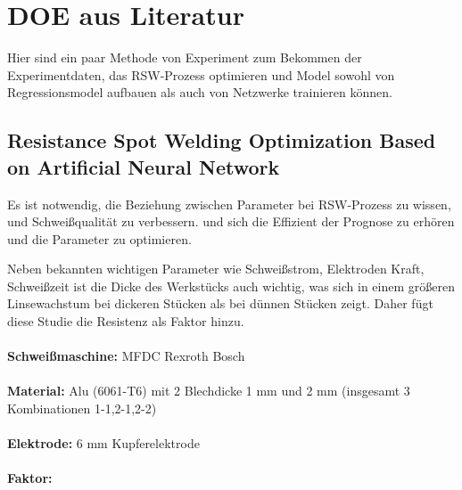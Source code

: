 \documentclass[english,ngerman]{tudscrreprt}
\begin{document}
\tableofcontents
\listoffigures
{}
\listoftables
{}
\printacronyms[style=acrotabu]
\printsymbols[style=symblongtabu]





\clearpage
\setcounter{page}{1}
\chapter{DOE aus Literatur}
Hier sind ein paar Methode von Experiment zum Bekommen der Experimentdaten, das RSW-Prozess optimieren und Model sowohl von Regressionsmodel aufbauen als auch von Netzwerke trainieren können. 

\section{Resistance Spot Welding Optimization Based on Artificial Neural Network\cite{Arunchai.2014}}
Es ist notwendig, die Beziehung zwischen Parameter bei RSW-Prozess zu wissen, und Schweißqualität zu verbessern. und sich die Effizient der Prognose zu erhören und die Parameter zu optimieren.

Neben bekannten wichtigen Parameter wie Schweißstrom, Elektroden Kraft, Schweißzeit ist die Dicke des Werkstücks auch wichtig, was sich in einem größeren Linsewachstum bei dickeren Stücken als bei dünnen Stücken zeigt. Daher fügt diese Studie die Resistenz als Faktor hinzu.\\
\\
\textbf{Schweißmaschine: }MFDC Rexroth Bosch\\
\\
\textbf{Material: }Alu (6061-T6) mit 2 Blechdicke 1 mm und 2 mm (insgesamt 3 Kombinationen 1-1,2-1,2-2)\\
\\
\textbf{Elektrode: }6 mm Kupferelektrode\\
\\
\textbf{Faktor: }
\end{document}
